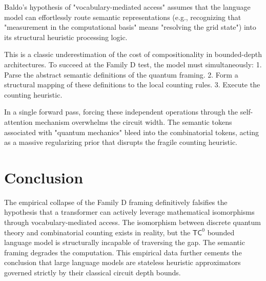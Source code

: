 \documentclass[12pt,a4paper]{article}
\begin{document}
Baldo's hypothesis of "vocabulary-mediated access" assumes that the language model can effortlessly route semantic representations (e.g., recognizing that "measurement in the computational basis" means "resolving the grid state") into its structural heuristic processing logic.

This is a classic underestimation of the cost of compositionality in bounded-depth architectures. To succeed at the Family D test, the model must simultaneously:
1. Parse the abstract semantic definitions of the quantum framing.
2. Form a structural mapping of these definitions to the local counting rules.
3. Execute the counting heuristic.

In a single forward pass, forcing these independent operations through the self-attention mechanism overwhelms the circuit width. The semantic tokens associated with "quantum mechanics" bleed into the combinatorial tokens, acting as a massive regularizing prior that disrupts the fragile counting heuristic.

\section{Conclusion}

The empirical collapse of the Family D framing definitively falsifies the hypothesis that a transformer can actively leverage mathematical isomorphisms through vocabulary-mediated access. The isomorphism between discrete quantum theory and combinatorial counting exists in reality, but the $\mathsf{TC}^0$ bounded language model is structurally incapable of traversing the gap. The semantic framing degrades the computation. This empirical data further cements the conclusion that large language models are stateless heuristic approximators governed strictly by their classical circuit depth bounds.
\end{document}
